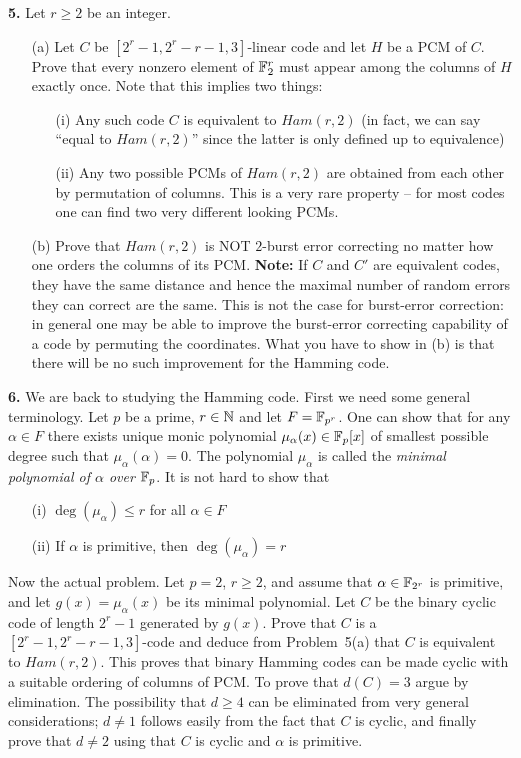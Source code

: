 \documentclass[12pt]{amsart}
\begin{document}
{\bf 5.} Let $r\geq 2$ be an integer.
\begin{itemize}
\item[(a)] Let $C$ be $[2^r-1,2^r-r-1,3]$-linear code and let $H$ be a PCM of $C$. Prove that every nonzero element of ${\mathbb F}_2^r$ must appear among the columns of $H$ exactly once. Note that this implies two things:
\begin{itemize}
\item[(i)] Any such code $C$ is equivalent to $Ham(r,2)$ (in fact, we can say ``equal to $Ham(r,2)$'' since the latter is only defined up to equivalence)
\item[(ii)] Any two possible PCMs of $Ham(r,2)$ are obtained from each other by permutation of columns. This is a very rare property -- for most codes one can find two very different looking PCMs. 
\end{itemize}
\item[(b)] Prove that $Ham(r,2)$ is NOT $2$-burst error correcting no matter how one orders the columns of its PCM. {\bf Note:}
If $C$ and $C'$ are equivalent codes, they have the same distance and hence the maximal number of random errors they can correct are the same. This is not the case for burst-error correction: in general one may be able to improve the burst-error correcting capability of a code by permuting the coordinates. What you have to show in (b) is that there will be no such improvement for the Hamming code.
\end{itemize}
\newpage
{\bf 6.} We are back to studying the Hamming code. First we need some general terminology. Let $p$ be a prime, $r\in{\mathbb N}$ and let $F={\mathbb F}_{p^r}$. One can show that for any $\alpha\in F$ there exists unique monic polynomial $\mu_{\alpha}(x)\in{\mathbb F}_p[x]$ of smallest possible degree such that $\mu_{\alpha}(\alpha)=0$. The polynomial $\mu_{\alpha}$ is called the {\it minimal polynomial of $\alpha$ over ${\mathbb F}_p$}. It is not hard to show that
\begin{itemize}
\item[(i)] $\deg(\mu_{\alpha})\leq r$ for all $\alpha\in F$
\item[(ii)] If $\alpha$ is primitive, then $\deg(\mu_{\alpha})=r$
\end{itemize}
Now the actual problem. Let $p=2$, $r\geq 2$, and assume that $\alpha\in {\mathbb F}_{2^r}$ is primitive, and let $g(x)=\mu_{\alpha}(x)$
be its minimal polynomial. Let $C$ be the binary cyclic code of length $2^r-1$ generated by $g(x)$. Prove that
$C$ is a $[2^r-1,2^r-r-1,3]$-code and deduce from Problem~5(a) that $C$ is equivalent to $Ham(r,2)$. This proves that binary Hamming codes can be made cyclic with a suitable ordering of columns of PCM.
 To prove that $d(C)=3$ argue by elimination. The possibility that $d\geq 4$ can be eliminated from very general considerations; $d\neq 1$ follows easily from the fact that $C$ is cyclic, and finally prove that $d\neq 2$ using that $C$ is cyclic and $\alpha$ is primitive.
\end{document}
